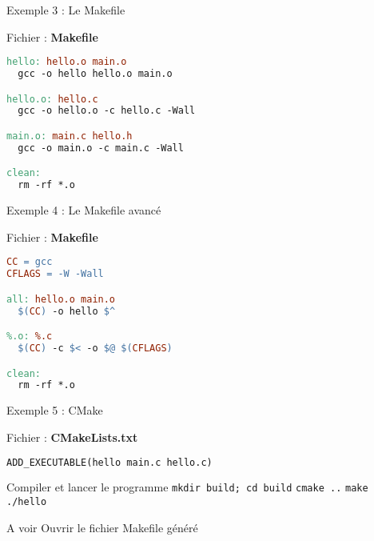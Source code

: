 \documentclass{beamer}
\begin{document}
\begin{frame}[fragile]{Exemple 3 : Le Makefile}

  \begin{block}{Fichier : \textbf{Makefile}}
  \begin{lstlisting}[language=make]
hello: hello.o main.o
  gcc -o hello hello.o main.o

hello.o: hello.c
  gcc -o hello.o -c hello.c -Wall

main.o: main.c hello.h
  gcc -o main.o -c main.c -Wall

clean:
  rm -rf *.o
\end{lstlisting}
  \end{block}
  
\end{frame}

\begin{frame}[fragile]{Exemple 4 : Le Makefile avancé}

  \begin{block}{Fichier : \textbf{Makefile}}
  \begin{lstlisting}[language=make]
CC = gcc
CFLAGS = -W -Wall

all: hello.o main.o
  $(CC) -o hello $^

%.o: %.c
  $(CC) -c $< -o $@ $(CFLAGS)

clean:
  rm -rf *.o
\end{lstlisting}
  \end{block}
  
\end{frame}


\begin{frame}[fragile]{Exemple 5 : CMake}

  \begin{block}{Fichier : \textbf{CMakeLists.txt}}
  \begin{lstlisting}[language=make]
ADD_EXECUTABLE(hello main.c hello.c)
\end{lstlisting}
  \end{block}
  
  \begin{block}{Compiler et lancer le programme}
    \textcolor{commandcolor}{\verb?mkdir build; cd build?}\linebreak
    \textcolor{commandcolor}{\verb?cmake ..?}\linebreak
    \textcolor{commandcolor}{\verb?make?}\linebreak
    \textcolor{commandcolor}{\verb?./hello?}
  \end{block}

  \begin{exampleblock}{A voir}
    Ouvrir le fichier Makefile généré
  \end{exampleblock}

\end{frame}
\end{document}
